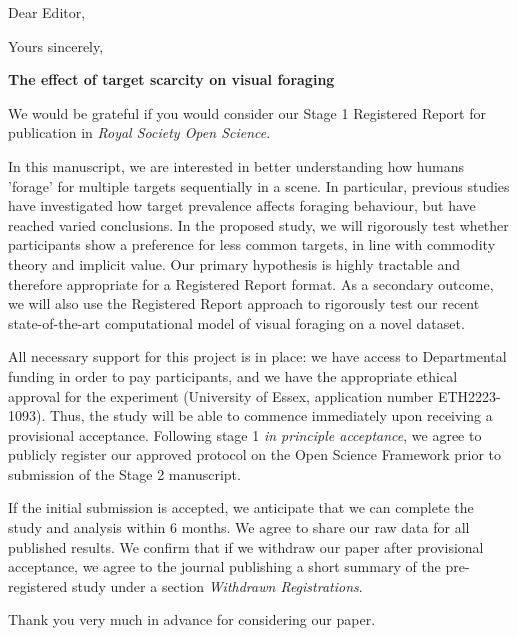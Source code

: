 \documentclass[11pt,a4paper,roman]{moderncv}        %
\begin{document}
\recipient{}{}
\date{\today}
\opening{Dear Editor,}
\closing{Yours sincerely,}
\makelettertitle

\textbf{The effect of target scarcity on visual foraging}

We would be grateful if you would consider our Stage 1 Registered Report for publication in \textit{Royal Society Open Science}.

In this manuscript, we are interested in better understanding how humans 'forage' for multiple targets sequentially in a scene. In particular, previous studies have investigated how target prevalence affects foraging behaviour, but have reached varied conclusions. In the proposed study, we will rigorously test whether participants show a preference for less common targets, in line with commodity theory and implicit value. Our primary hypothesis is highly tractable and therefore appropriate for a Registered Report format. As a secondary outcome, we will also use the Registered Report approach to rigorously test our recent state-of-the-art computational model of visual foraging on a novel dataset. 

All necessary support for this project is in place: we have access to Departmental funding in order to pay participants, and we have the appropriate ethical approval for the experiment (University of Essex, application number ETH2223-1093). Thus, the study will be able to commence immediately upon receiving a provisional acceptance. Following stage 1 \textit{in principle acceptance}, we agree to publicly register our approved protocol on the Open Science Framework prior to submission of the Stage 2 manuscript.

If the initial submission is accepted, we anticipate that we can complete the study and analysis within 6 months. We agree to share our raw data for all published results. We confirm that if we withdraw our paper after provisional acceptance, we agree to the journal publishing a short summary of the pre-registered study under a section \textit{Withdrawn Registrations}.

Thank you very much in advance for considering our paper.

\vspace{0.5cm}


\makeletterclosing
\end{document}

